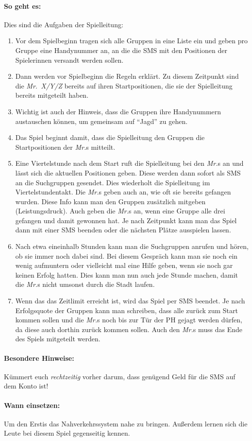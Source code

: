\paragraph{So geht es:} Dies sind die Aufgaben der Spielleitung:
\begin{enumerate}

\item  Vor dem Spielbeginn tragen sich alle Gruppen in eine Liste ein und geben pro Gruppe eine Handynummer an, an die die SMS
mit den Positionen der Spielerinnen versandt werden sollen.

\item Dann werden vor Spielbeginn die Regeln erklärt. Zu diesem Zeitpunkt sind die \emph{Mr.~X/Y/Z} bereits auf
ihren Startpositionen, die sie der Spielleitung bereits mitgeteilt haben. 

\item  Wichtig ist auch der Hinweis, dass die Gruppen ihre Handynummern austauschen können, um gemeinsam auf "`Jagd"' zu gehen.

\item  Das Spiel beginnt damit, dass die Spielleitung den Gruppen die Startpositionen der \emph{Mr.}s mitteilt.

\item  Eine Viertelstunde nach dem Start ruft die Spielleitung bei den \emph{Mr.}s an und lässt sich die aktuellen Positionen
geben. Diese werden dann sofort als SMS an die Suchgruppen gesendet. 
Dies wiederholt die Spielleitung im Viertelstundentakt. Die \emph{Mr.}s geben auch an, wie oft sie bereits gefangen wurden. Diese Info
kann man den Gruppen zusätzlich mitgeben (Leistungsdruck). Auch geben die \emph{Mr.}s an, wenn eine Gruppe alle drei
gefangen und damit gewonnen hat. Je nach Zeitpunkt kann man das Spiel dann mit einer SMS beenden oder die nächsten
Plätze ausspielen lassen.

\item  Nach etwa eineinhalb Stunden kann man die Suchgruppen anrufen und hören, ob sie immer noch dabei sind. Bei
diesem Gespräch kann man sie noch ein wenig aufmuntern oder vielleicht mal eine Hilfe geben, wenn sie noch gar keinen
Erfolg hatten. Dies kann man nun auch jede Stunde machen, damit die \emph{Mr.}s nicht umsonst durch die Stadt laufen.

\item  Wenn das das Zeitlimit erreicht ist, wird das Spiel per SMS beendet. Je nach Erfolgsquote der Gruppen kann man schreiben,
dass alle zurück zum Start kommen sollen und die \emph{Mr.}s noch bis zur Tür der PH gejagt werden dürfen, da diese auch
dorthin zurück kommen sollen. Auch den \emph{Mr.}s muss das Ende des Spiels mitgeteilt werden.
\end{enumerate}

\paragraph{Besondere Hinweise:} Kümmert euch \emph{rechtzeitig} vorher darum, dass genügend Geld für die SMS auf dem Konto ist!
\paragraph{Wann einsetzen:} Um den Erstis das Nahverkehrssystem nahe zu bringen. Außerdem lernen sich die Leute bei diesem Spiel gegenseitig kennen.

